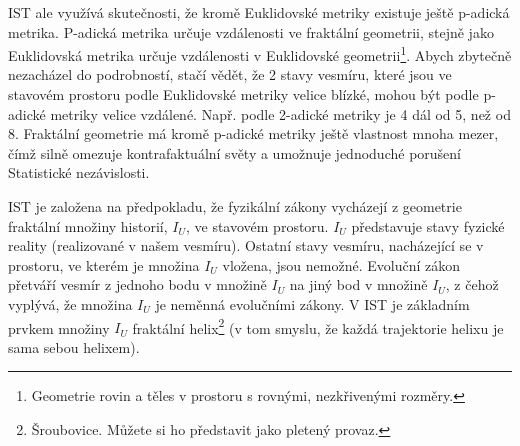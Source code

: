 IST ale využívá skutečnosti, že kromě Euklidovské metriky existuje ještě p-adická metrika. P-adická metrika určuje vzdálenosti ve fraktální geometrii, stejně jako Euklidovská metrika určuje vzdálenosti v Euklidovské geometrii\footnote[22]{Geometrie rovin a těles v prostoru s rovnými, nezkřivenými rozměry.}. Abych zbytečně nezacházel do podrobností, stačí vědět, že 2 stavy vesmíru, které jsou ve stavovém prostoru podle Euklidovské metriky velice blízké, mohou být podle p-adické metriky velice vzdálené. Např. podle 2-adické metriky je 4 dál od 5, než od 8. Fraktální geometrie má kromě p-adické metriky ještě vlastnost mnoha mezer, čímž silně omezuje kontrafaktuální světy a umožnuje jednoduché porušení Statistické nezávislosti.

IST je založena na předpokladu, že fyzikální zákony vycházejí z geometrie fraktální množiny historií, $I_U$, ve stavovém prostoru. $I_U$ představuje stavy fyzické reality (realizované v našem vesmíru). Ostatní stavy vesmíru, nacházející se v prostoru, ve kterém je množina $I_U$ vložena, jsou nemožné. Evoluční zákon přetváří vesmír z jednoho bodu v množině $I_U$ na jiný bod v množině $I_U$, z čehož vyplývá, že množina $I_U$ je neměnná evolučními zákony. V IST je základním prvkem množiny $I_U$ fraktální helix\footnote[23]{Šroubovice. Můžete si ho představit jako pletený provaz.} (v tom smyslu, že každá trajektorie helixu je sama sebou helixem).
